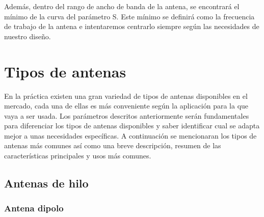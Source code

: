\par Además, dentro del rango de ancho de banda de la antena, se encontrará el mínimo de la curva del parámetro S. Este mínimo se definirá como la frecuencia de trabajo de la antena e intentaremos centrarlo siempre según las necesidades de nuestro diseño.


\section{Tipos de antenas}

\par En la práctica existen una gran variedad de tipos de antenas disponibles en el mercado, cada una de ellas es más conveniente según la aplicación para la que vaya a ser usada. Los parámetros descritos anteriormente serán fundamentales para diferenciar los tipos de antenas disponibles y saber identificar cual se adapta mejor a unas necesidades específicas. A continuación se mencionaran los tipos de antenas más comunes así como una breve descripción, resumen de las características principales y usos más comunes.

\subsection{Antenas de hilo}
\subsubsection{Antena dipolo}

